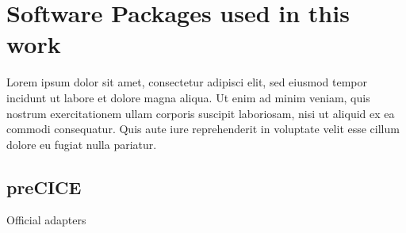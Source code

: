 \chapter{Software Packages used in this work}
\label{cha:software}
Lorem ipsum dolor sit amet, consectetur adipisci elit, sed eiusmod tempor incidunt ut labore et dolore magna aliqua. Ut enim ad minim veniam, quis nostrum exercitationem ullam corporis suscipit laboriosam, nisi ut aliquid ex ea commodi consequatur. Quis aute iure reprehenderit in voluptate velit esse cillum dolore eu fugiat nulla pariatur.


\section{preCICE}
\label{sec:precice}

\cite{uekermann2017official} Official adapters